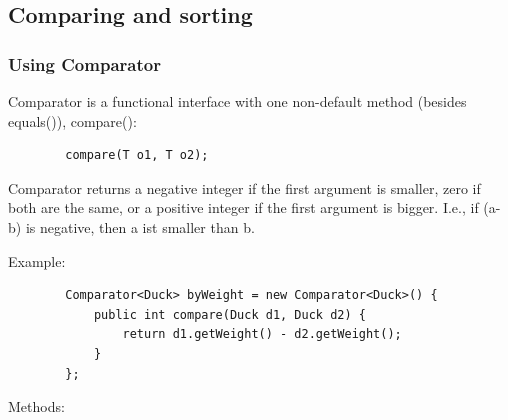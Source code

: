 \documentclass{scrartcl}
\begin{document}
\subsection{Comparing and sorting}

\subsubsection{Using Comparator}

    Comparator is a functional interface with one non-default method (besides equals()), compare():

    \begin{lstlisting}
        compare(T o1, T o2);
    \end{lstlisting}

    Comparator returns a negative integer if the first argument is smaller, zero if both are the same, or a positive integer if the first argument is bigger. I.e., if (a-b) is negative, then a ist smaller than b.

    Example:
    \begin{lstlisting}
        Comparator<Duck> byWeight = new Comparator<Duck>() {
            public int compare(Duck d1, Duck d2) {
                return d1.getWeight() - d2.getWeight();
            }
        };
    \end{lstlisting}

    Methods:
\end{document}

